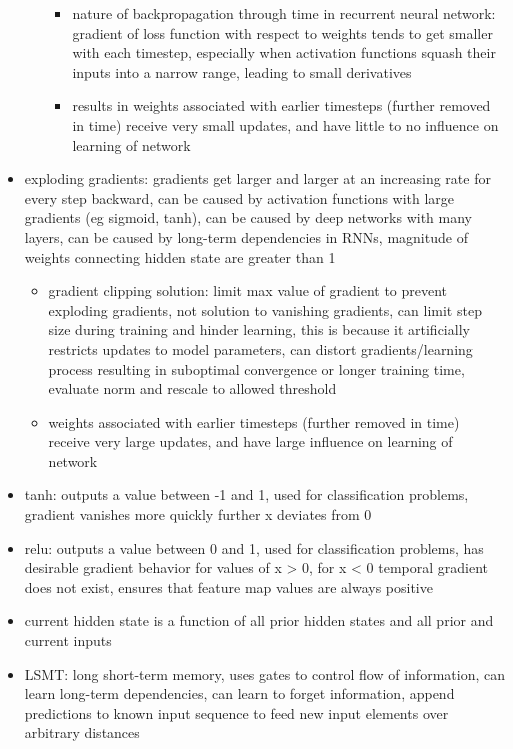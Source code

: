 \documentclass[10pt]{article}
\begin{document}
\begin{itemize}[label=\(\star\), leftmargin=1em, itemsep=-0.3em]
\begin{itemize}[label=\(\star\), leftmargin=1em, itemsep=-0.3em]
\begin{itemize}[label=\(\star\), leftmargin=1em, itemsep=-0.3em]
                        \item nature of backpropagation through time in recurrent neural network: gradient of loss function with respect to weights tends to get smaller with each timestep, especially when activation functions squash their inputs into a narrow range, leading to small derivatives
                        \item results in weights associated with earlier timesteps (further removed in time) receive very small updates, and have little to no influence on learning of network
                    \end{itemize}
          \end{itemize}
    \item exploding gradients: gradients get larger and larger at an increasing rate for every step backward, can be caused by activation functions with large gradients (eg sigmoid, tanh), can be caused by deep networks with many layers, can be caused by long-term dependencies in RNNs, magnitude of weights connecting hidden state are greater than 1
          \begin{itemize}[label=\(\star\), leftmargin=1em, itemsep=-0.3em]
              \item gradient clipping solution: limit max value of gradient to prevent exploding gradients, not solution to vanishing gradients, can limit step size during training and hinder learning, this is because it artificially restricts updates to model parameters, can distort gradients/learning process resulting in suboptimal convergence or longer training time, evaluate norm and rescale to allowed
                    threshold
              \item weights associated with earlier timesteps (further removed in time) receive very large updates, and have large influence on learning of network
          \end{itemize}
    \item tanh: outputs a value between -1 and 1, used for classification problems, gradient vanishes more quickly further x deviates from 0
    \item relu: outputs a value between 0 and 1, used for classification problems,  has desirable gradient behavior for values of x > 0, for x < 0 temporal gradient does not exist, ensures that feature map values are always positive
    \item current hidden state is a function of all prior hidden states and all prior and current inputs
    \item LSMT: long short-term memory, uses gates to control flow of information, can learn long-term dependencies, can learn to forget information, append predictions to known input sequence to feed new input elements over arbitrary distances
          \begin{itemize}[label=\(\star\), leftmargin=1em, itemsep=-0.3em]


\end{itemize}
\end{itemize}
\end{document}
